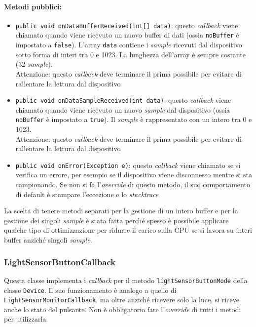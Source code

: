 \paragraph{Metodi pubblici:}\begin{itemize}
	\item \texttt{public void onDataBufferReceived(int[] data){}}: questo \textit{callback} viene chiamato quando viene ricevuto un nuovo buffer di dati (ossia \texttt{noBuffer} è impostato a \texttt{false}). L'array \texttt{data} contiene i \textit{sample} ricevuti dal dispositivo sotto forma di interi tra 0 e 1023. La lunghezza dell'array è sempre costante (32 \textit{sample}).\\
	Attenzione: questo \textit{callback} deve terminare il prima possibile per evitare di rallentare la lettura dal dispositivo
	\item \texttt{public void onDataSampleReceived(int data){}}: questo \textit{callback} viene chiamato quando viene ricevuto un nuovo \textit{sample} dal dispositivo (ossia \texttt{noBuffer} è impostato a \texttt{true}). Il \textit{sample} è rappresentato con un intero tra 0 e 1023.\\
	Attenzione: questo \textit{callback} deve terminare il prima possibile per evitare di rallentare la lettura dal dispositivo
	\item \texttt{public void onError(Exception e)}: questo \textit{callback} viene chiamato se si verifica un errore, per esempio se il dispositivo viene disconnesso mentre si sta campionando. Se non si fa l'\textit{override} di questo metodo, il suo comportamento di default è stampare l'eccezione e lo \textit{stacktrace}
\end{itemize}

La scelta di tenere metodi separati per la gestione di un intero buffer e per la gestione dei singoli \textit{sample} è stata fatta perché spesso è possibile applicare qualche tipo di ottimizzazione per ridurre il carico sulla CPU se si lavora su interi buffer anziché singoli \textit{sample}.

\subsubsection{LightSensorButtonCallback}
Questa classe implementa i \textit{callback} per il metodo \texttt{lightSensorButtonMode} della classe \texttt{Device}. Il suo funzionamento è analogo a quello di \texttt{LightSensorMonitorCallback}, ma oltre anziché ricevere solo la luce, si riceve anche lo stato del pulsante. Non è obbligatorio fare l'\textit{override} di tutti i metodi per utilizzarla.

